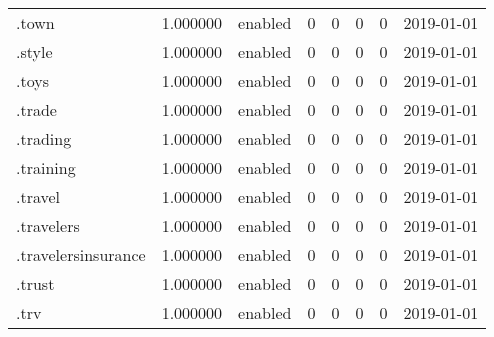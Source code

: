 \begin{tabular}{lrlrrrrl}
.town                     &          1.000000 &         enabled &                           0 &                           0 &                           0 &                   0 &           2019-01-01 \\
.style                    &          1.000000 &         enabled &                           0 &                           0 &                           0 &                   0 &           2019-01-01 \\
.toys                     &          1.000000 &         enabled &                           0 &                           0 &                           0 &                   0 &           2019-01-01 \\
.trade                    &          1.000000 &         enabled &                           0 &                           0 &                           0 &                   0 &           2019-01-01 \\
.trading                  &          1.000000 &         enabled &                           0 &                           0 &                           0 &                   0 &           2019-01-01 \\
.training                 &          1.000000 &         enabled &                           0 &                           0 &                           0 &                   0 &           2019-01-01 \\
.travel                   &          1.000000 &         enabled &                           0 &                           0 &                           0 &                   0 &           2019-01-01 \\
.travelers                &          1.000000 &         enabled &                           0 &                           0 &                           0 &                   0 &           2019-01-01 \\
.travelersinsurance       &          1.000000 &         enabled &                           0 &                           0 &                           0 &                   0 &           2019-01-01 \\
.trust                    &          1.000000 &         enabled &                           0 &                           0 &                           0 &                   0 &           2019-01-01 \\
.trv                      &          1.000000 &         enabled &                           0 &                           0 &                           0 &                   0 &           2019-01-01 \\

\end{tabular}
